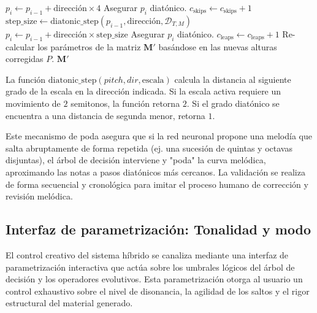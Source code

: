 \begin{algorithm}[H]
\begin{algorithmic}[1]
                        \STATE $p_i \leftarrow p_{i-1} + \text{dirección} \times 4$
                    \ENDIF
                    \STATE Asegurar $p_i$ diatónico.
                    \STATE $c_{\text{skips}} \leftarrow c_{\text{skips}} + 1$
                \ELSE
                    \STATE $\text{step\_size} \leftarrow \text{diatonic\_step}(p_{i-1}, \text{dirección}, \mathcal{D}_{T,M})$
                    \STATE $p_i \leftarrow p_{i-1} + \text{dirección} \times \text{step\_size}$
                    \STATE Asegurar $p_i$ diatónico.
                \ENDIF
            \ELSE
                \STATE $c_{\text{leaps}} \leftarrow c_{\text{leaps}} + 1$
            \ENDIF
        \ENDIF
    \ENDIF
\ENDFOR
\STATE Re-calcular los parámetros de la matriz $\mathbf{M}'$ basándose en las nuevas alturas corregidas $P$.
\RETURN $\mathbf{M}'$
\end{algorithmic}
\end{algorithm}

La función $\text{diatonic\_step}(pitch, dir, \text{escala})$ calcula la distancia al siguiente grado de la escala en la dirección indicada. Si la escala activa requiere un movimiento de $2$ semitonos, la función retorna $2$. Si el grado diatónico se encuentra a una distancia de segunda menor, retorna $1$.

Este mecanismo de poda asegura que si la red neuronal propone una melodía que salta abruptamente de forma repetida (ej. una sucesión de quintas y octavas disjuntas), el árbol de decisión interviene y "poda" la curva melódica, aproximando las notas a pasos diatónicos más cercanos. La validación se realiza de forma secuencial y cronológica para imitar el proceso humano de corrección y revisión melódica.

\subsection{Interfaz de parametrización: Tonalidad y modo}

El control creativo del sistema híbrido se canaliza mediante una interfaz de parametrización interactiva que actúa sobre los umbrales lógicos del árbol de decisión y los operadores evolutivos. Esta parametrización otorga al usuario un control exhaustivo sobre el nivel de disonancia, la agilidad de los saltos y el rigor estructural del material generado. 

